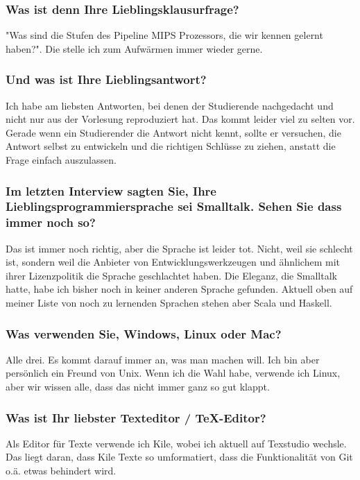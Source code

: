 {\subsubsection{Was ist denn Ihre Lieblingsklausurfrage?}
"Was sind die Stufen des Pipeline MIPS Prozessors, die wir kennen gelernt haben?". Die stelle ich zum Aufwärmen immer wieder gerne.

\subsubsection{Und was ist Ihre Lieblingsantwort?}
Ich habe am liebsten Antworten, bei denen der Studierende nachgedacht und nicht nur aus der Vorlesung reproduziert hat. Das kommt leider viel zu selten vor. 
Gerade wenn ein Studierender die Antwort nicht kennt, sollte er versuchen, die Antwort selbst zu entwickeln und die richtigen Schlüsse zu ziehen, anstatt die Frage einfach auszulassen.

\subsubsection{Im letzten Interview sagten Sie, Ihre Lieblingsprogrammiersprache sei Smalltalk. Sehen Sie dass immer noch so?}
Das ist immer noch richtig, aber die Sprache ist leider tot. Nicht, weil sie schlecht ist, sondern weil die Anbieter von Entwicklungswerkzeugen und ähnlichem mit ihrer Lizenzpolitik die Sprache geschlachtet haben. Die Eleganz, die Smalltalk hatte, habe ich bisher noch in keiner anderen Sprache gefunden. Aktuell oben auf meiner Liste von noch zu lernenden Sprachen stehen aber Scala und Haskell.

\subsubsection{Was verwenden Sie, Windows, Linux oder Mac?}
Alle drei. Es kommt darauf immer an, was man machen will. Ich bin aber persönlich ein Freund von Unix. Wenn ich die Wahl habe, verwende ich Linux, aber wir wissen alle, dass das nicht immer ganz so gut klappt. 

\subsubsection{Was ist Ihr liebster Texteditor / TeX-Editor?}
Als Editor für Texte verwende ich Kile,  wobei ich aktuell auf Texstudio wechsle. Das liegt daran, dass Kile Texte so umformatiert, dass die Funktionalität von Git o.ä. etwas behindert wird.

}
